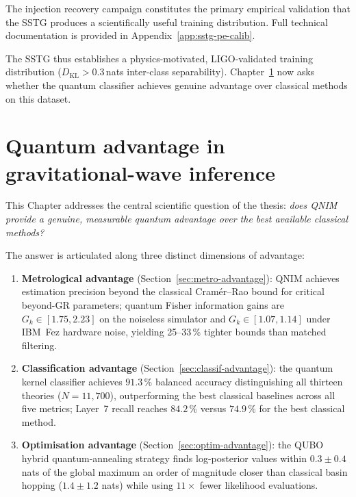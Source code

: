 \documentclass[11pt,a4paper, english]{book}
\theoremstyle{plain}
\theoremstyle{definition}
\numberwithin{equation}{chapter}
\numberwithin{figure}{chapter}
\numberwithin{table}{chapter}
\begin{document}
The injection recovery campaign constitutes the primary empirical validation
that the SSTG produces a scientifically useful training distribution. Full 
technical documentation is provided in Appendix~\ref{app:sstg-pe-calib}.

The SSTG thus establishes a physics-motivated, LIGO-validated training distribution ($D_\mathrm{KL} > 0.3$\,nats inter-class separability). Chapter~\ref{chap:quantum-advantage} now asks whether the quantum classifier achieves genuine advantage over classical methods on this dataset.



\chapter{Quantum advantage in gravitational-wave inference}
\label{chap:quantum-advantage}

This Chapter addresses the central scientific question of the thesis: 
\emph{does QNIM provide a genuine, measurable quantum advantage over the best available classical methods?}  

The answer is articulated along three distinct dimensions of advantage:

\begin{enumerate}
  \item \textbf{Metrological advantage} (Section~\ref{sec:metro-advantage}):
        QNIM achieves estimation precision beyond the classical Cramér--Rao bound
        for critical beyond-GR parameters; quantum Fisher information gains are
        $G_k \in [1.75, 2.23]$ on the noiseless simulator and
        $G_k \in [1.07, 1.14]$ under IBM~Fez hardware noise, yielding
        25--33\,\% tighter bounds than matched filtering.

  \item \textbf{Classification advantage}
        (Section~\ref{sec:classif-advantage}): the quantum kernel classifier
        achieves $91.3\,\%$ balanced accuracy distinguishing all thirteen theories
        ($N = 11{,}700$), outperforming the best classical baselines across all
        five metrics; Layer~7 recall reaches $84.2\,\%$ versus $74.9\,\%$
        for the best classical method.

  \item \textbf{Optimisation advantage}
      (Section~\ref{sec:optim-advantage}): the QUBO hybrid quantum-annealing
      strategy finds log-posterior values within $0.3 \pm 0.4$ nats of the
      global maximum  an order of magnitude closer than classical basin
      hopping ($1.4 \pm 1.2$ nats)  while using $11\times$ fewer
      likelihood evaluations.
\end{enumerate}
\end{document}
